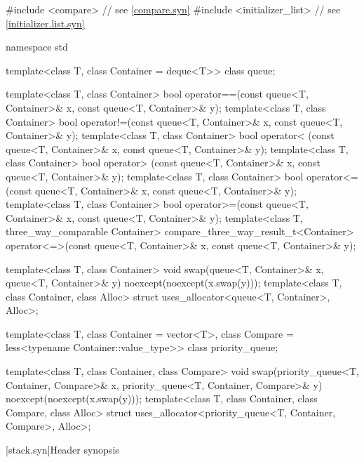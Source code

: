 \begin{codeblock}
#include <compare>              // see \ref{compare.syn}
#include <initializer_list>     // see \ref{initializer.list.syn}

namespace std {
  template<class T, class Container = deque<T>> class queue;

  template<class T, class Container>
    bool operator==(const queue<T, Container>& x, const queue<T, Container>& y);
  template<class T, class Container>
    bool operator!=(const queue<T, Container>& x, const queue<T, Container>& y);
  template<class T, class Container>
    bool operator< (const queue<T, Container>& x, const queue<T, Container>& y);
  template<class T, class Container>
    bool operator> (const queue<T, Container>& x, const queue<T, Container>& y);
  template<class T, class Container>
    bool operator<=(const queue<T, Container>& x, const queue<T, Container>& y);
  template<class T, class Container>
    bool operator>=(const queue<T, Container>& x, const queue<T, Container>& y);
  template<class T, three_way_comparable Container>
    compare_three_way_result_t<Container>
      operator<=>(const queue<T, Container>& x, const queue<T, Container>& y);

  template<class T, class Container>
    void swap(queue<T, Container>& x, queue<T, Container>& y) noexcept(noexcept(x.swap(y)));
  template<class T, class Container, class Alloc>
    struct uses_allocator<queue<T, Container>, Alloc>;

  template<class T, class Container = vector<T>,
           class Compare = less<typename Container::value_type>>
    class priority_queue;

  template<class T, class Container, class Compare>
    void swap(priority_queue<T, Container, Compare>& x,
              priority_queue<T, Container, Compare>& y) noexcept(noexcept(x.swap(y)));
  template<class T, class Container, class Compare, class Alloc>
    struct uses_allocator<priority_queue<T, Container, Compare>, Alloc>;
}
\end{codeblock}

[stack.syn]{Header  synopsis}

